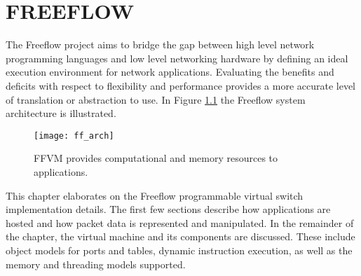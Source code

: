 \chapter{FREEFLOW}
\label{ff}
The Freeflow project aims to bridge the gap between high level network
programming languages and low level networking hardware by defining an ideal
execution environment for network applications. Evaluating the benefits and
deficits with respect to flexibility and performance provides a more accurate
level of translation or abstraction to use. In Figure \ref{ff_arch}
the Freeflow system architecture is illustrated.

\begin{figure}[h]
\centering
\texttt{[image: ff\_arch]}
\caption{FFVM provides computational and memory resources to applications.}
\label{ff_arch}
\end{figure}

This chapter elaborates on the Freeflow programmable virtual switch
implementation details. The first few sections describe how applications are
hosted and how packet data is represented and manipulated. In the remainder of
the chapter, the virtual machine and its components are discussed. These include
object models for ports and tables, dynamic instruction execution, as well as
the memory and threading models supported.

%
%

